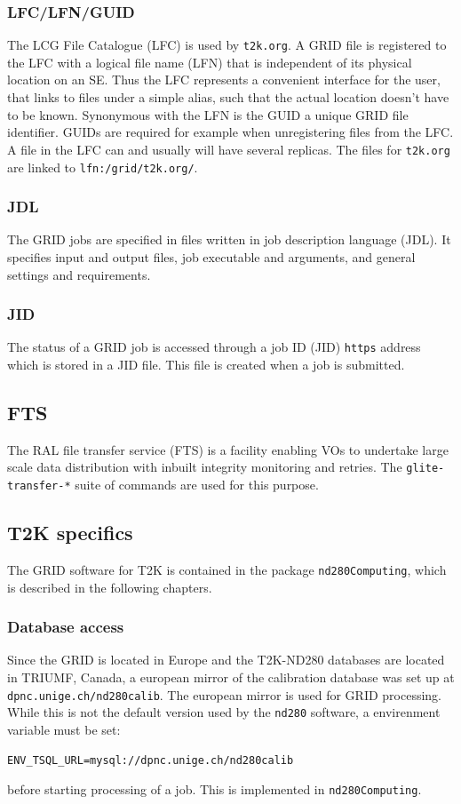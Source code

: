 \documentclass[11pt]{article}
\begin{document}
\subsubsection*{LFC/LFN/GUID}
The LCG File Catalogue (LFC) is used by \verb+t2k.org+. A GRID file is
registered to the LFC with a logical file name (LFN) that is independent
of its physical location on an SE. Thus the LFC represents a
convenient interface for the user, that links to files under a simple
alias, such that the actual location doesn't have to be
known. Synonymous with the LFN is the GUID a unique GRID file
identifier. GUIDs are required for example when unregistering files
from the LFC. A file in the LFC can and usually will have several
replicas. The files for \verb+t2k.org+ are linked to \verb+lfn:/grid/t2k.org/+.

\subsubsection*{JDL}
The GRID jobs are specified in files written in job description language (JDL). It specifies input and output files, job executable and arguments, and general settings and requirements.

\subsubsection*{JID}
The status of a GRID job is accessed through a job ID (JID) \verb+https+ address which is stored in a JID file. This file is created when a job is submitted.

\subsection*{FTS}
The RAL file transfer service (FTS) \cite{fts} is a facility enabling VOs to
undertake large scale data distribution with inbuilt integrity
monitoring and retries. The \verb+glite-transfer-*+ suite of commands
are used for this purpose. 

\subsection{T2K specifics}

The GRID software for T2K is contained in the package \verb+nd280Computing+, which is described in the following chapters.

\subsubsection*{Database access}
Since the GRID is located in Europe and the T2K-ND280 databases are located in TRIUMF, Canada, a european mirror of the calibration database was set up at \verb+dpnc.unige.ch/nd280calib+. The european mirror is used for GRID processing. While this is not the default version used by the \verb+nd280+ software, a envirenment variable must be set:
\begin{verbatim}
ENV_TSQL_URL=mysql://dpnc.unige.ch/nd280calib
\end{verbatim}
before starting processing of a job. This is implemented in \verb+nd280Computing+.
\end{document}
